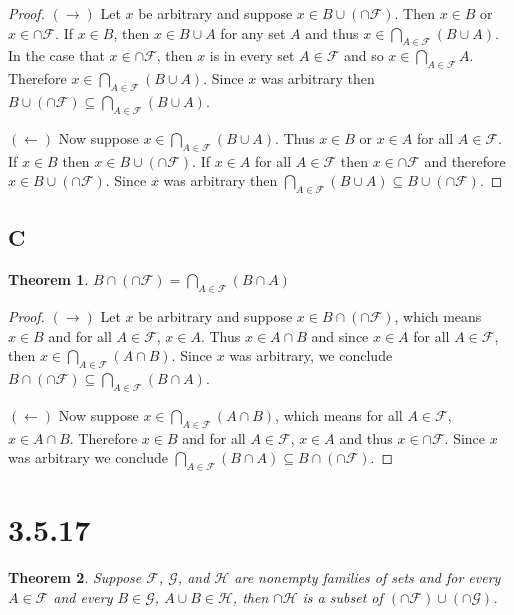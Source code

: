 \documentclass{article}
\newcommand{\F}{\mathcal{F}}
\newcommand{\G}{\mathcal{G}}
\newtheorem*{theorem}{Theorem}  %
\begin{document}
\begin{proof}
$(\rightarrow)$ Let $x$ be arbitrary and suppose $x \in B \cup (\cap \F)$. Then $x \in B$ or $x \in \cap \F$. If $x \in B$, then $x \in B \cup A$ for any set $A$ and thus $x \in \bigcap_{A \in \F} (B \cup A)$. In the case that $x \in \cap \F$, then $x$ is in every set $A \in \F$ and so $x \in \bigcap_{A \in \F} A$. Therefore $x \in \bigcap_{A \in \F} (B \cup A)$. Since $x$ was arbitrary then $B \cup (\cap \F) \subseteq \bigcap_{A \in \F} (B \cup A)$.

$(\leftarrow)$ Now suppose $x \in \bigcap_{A \in \F} (B \cup A)$. Thus $x \in B$ or $x \in A$ for all $A \in \F$. If $x \in B$ then $x \in B \cup (\cap \F)$. If $x \in A$ for all $A \in \F$ then $x \in \cap \F$ and therefore $x \in B \cup (\cap \F)$. Since $x$ was arbitrary then $\bigcap_{A \in \F} (B \cup A) \subseteq B \cup (\cap \F)$.
\end{proof}

\subsection*{C}
\begin{theorem} $B \cap ( \cap \F ) = \bigcap_{A \in \F} ( B \cap A )$
\end{theorem}

\begin{proof}
$(\rightarrow)$ Let $x$ be arbitrary and suppose $x \in B \cap ( \cap \F )$, which means $x \in B$ and for all $A \in \F$, $x \in A$. Thus $x \in A \cap B$ and since $x \in A$ for all $A \in \F$, then $x \in \bigcap_{A \in \F} (A \cap B)$. Since $x$ was arbitrary, we conclude $B \cap ( \cap \F ) \subseteq \bigcap_{ A \in \F } ( B \cap A )$.

$(\leftarrow)$ Now suppose $x \in \bigcap_{A \in \F} (A \cap B)$, which means for all $A \in \F$, $x \in A \cap B$. Therefore $x \in B$ and for all $A \in \F$, $x \in A$ and thus $x \in \cap \F$. Since $x$ was arbitrary we conclude $\bigcap_{A \in \F} ( B \cap A ) \subseteq B \cap ( \cap \F )$.
\end{proof}

\section*{ 3.5.17 }

\begin{theorem}
Suppose $\F$, $\G$, and $\mathcal{H}$ are nonempty families of sets and for every $A \in \F$ and every $B \in \G$, $A \cup B \in \mathcal{H}$, then $\cap \mathcal{H}$ is a subset of $( \cap \F ) \cup ( \cap \G )$. 
\end{theorem}
\end{document}

